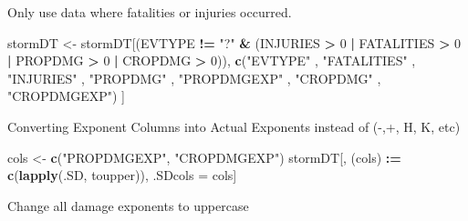 \documentclass[]{article}
\newenvironment{Shaded}{\begin{snugshade}}{\end{snugshade}}
\newcommand{\DecValTok}[1]{\textcolor[rgb]{0.00,0.00,0.81}{#1}}
\newcommand{\ErrorTok}[1]{\textcolor[rgb]{0.64,0.00,0.00}{\textbf{#1}}}
\newcommand{\KeywordTok}[1]{\textcolor[rgb]{0.13,0.29,0.53}{\textbf{#1}}}
\newcommand{\NormalTok}[1]{#1}
\newcommand{\OperatorTok}[1]{\textcolor[rgb]{0.81,0.36,0.00}{\textbf{#1}}}
\newcommand{\StringTok}[1]{\textcolor[rgb]{0.31,0.60,0.02}{#1}}
\begin{document}
Only use data where fatalities or injuries occurred.

\begin{Shaded}
\begin{Highlighting}[]
\NormalTok{stormDT <-}\StringTok{ }\NormalTok{stormDT[(EVTYPE }\OperatorTok{!=}\StringTok{ "?"} \OperatorTok{&}\StringTok{ }
\StringTok{             }\NormalTok{(INJURIES }\OperatorTok{>}\StringTok{ }\DecValTok{0} \OperatorTok{|}\StringTok{ }\NormalTok{FATALITIES }\OperatorTok{>}\StringTok{ }\DecValTok{0} \OperatorTok{|}\StringTok{ }\NormalTok{PROPDMG }\OperatorTok{>}\StringTok{ }\DecValTok{0} \OperatorTok{|}\StringTok{ }\NormalTok{CROPDMG }\OperatorTok{>}\StringTok{ }\DecValTok{0}\NormalTok{)), }\KeywordTok{c}\NormalTok{(}\StringTok{"EVTYPE"}
\NormalTok{                                                                            , }\StringTok{"FATALITIES"}
\NormalTok{                                                                            , }\StringTok{"INJURIES"}
\NormalTok{                                                                            , }\StringTok{"PROPDMG"}
\NormalTok{                                                                            , }\StringTok{"PROPDMGEXP"}
\NormalTok{                                                                            , }\StringTok{"CROPDMG"}
\NormalTok{                                                                            , }\StringTok{"CROPDMGEXP"}\NormalTok{) ]}
\end{Highlighting}
\end{Shaded}

Converting Exponent Columns into Actual Exponents instead of (-,+, H, K,
etc)

\begin{Shaded}
\begin{Highlighting}[]
\NormalTok{cols <-}\StringTok{ }\KeywordTok{c}\NormalTok{(}\StringTok{"PROPDMGEXP"}\NormalTok{, }\StringTok{"CROPDMGEXP"}\NormalTok{)}
\NormalTok{stormDT[,  (cols) }\OperatorTok{:}\ErrorTok{=}\StringTok{ }\KeywordTok{c}\NormalTok{(}\KeywordTok{lapply}\NormalTok{(.SD, toupper)), .SDcols =}\StringTok{ }\NormalTok{cols]}
\end{Highlighting}
\end{Shaded}

Change all damage exponents to uppercase
\end{document}
